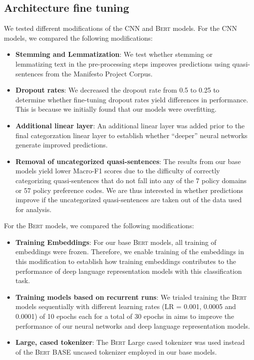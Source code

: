 \documentclass[11pt]{article}
\begin{document}
\subsection{Architecture fine tuning}
We tested different modifications of the CNN and \textsc{Bert} models. For the CNN models, we compared the following modifications:
\begin{itemize}
    \item \textbf{Stemming and Lemmatization}: We test whether stemming or lemmatizing text in the pre-processing steps improves predictions using quasi-sentences from the Manifesto Project Corpus.
    \item \textbf{Dropout rates}: We decreased the dropout rate from 0.5 to 0.25 to determine whether fine-tuning dropout rates yield differences in performance. This is because we initially found that our models were overfitting.
    \item \textbf{Additional linear layer}: An additional linear layer was added prior to the final categorzation linear layer to establish whether ``deeper'' neural networks generate improved predictions.
    \item \textbf{Removal of uncategorized quasi-sentences}: The results from our base models yield lower Macro-F1 scores due to the difficulty of correctly categorizing quasi-sentences that do not fall into any of the 7 policy domains or 57 policy preference codes. We are thus interested in whether predictions improve if the uncategorized quasi-sentences are taken out of the data used for analysis.
\end{itemize}
For the \textsc{Bert} models, we compared the following modifications:
\begin{itemize}
    \item \textbf{Training Embeddings}: For our base \textsc{Bert} models, all training of embeddings were frozen. Therefore, we enable training of the embeddings in this modification to establish how training embeddings contributes to the performance of deep language representation models with this classification task.
    \item \textbf{Training models based on recurrent runs}: We trialed training the \textsc{Bert} models sequentially with different learning rates (LR = 0.001, 0.0005 and 0.0001) of 10 epochs each for a total of 30 epochs in aims to improve the performance of our neural networks and deep language representation models.
    \item \textbf{Large, cased tokenizer}: The \textsc{Bert} Large cased tokenizer was used instead of the \textsc{Bert} BASE uncased tokenizer employed in our base models.

\end{itemize}
\end{document}
